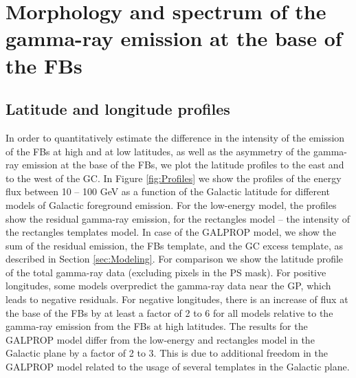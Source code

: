 \section{Morphology and spectrum of the gamma-ray emission at the base of the FBs}


\subsection{Latitude and longitude profiles}
\label{sec:Latitude_profiles}

In order to quantitatively estimate the difference in the intensity of the emission of the FBs at high and at low latitudes, as well as the asymmetry
of the gamma-ray emission at the base of the FBs,
we plot the latitude profiles to the east and to the west of the GC.
In Figure \ref{fig:Profiles} we show the profiles of the energy flux between 10 -- 100 GeV as a function 
of the Galactic latitude for different models of Galactic foreground emission.
For the low-energy model, the profiles show the residual gamma-ray emission, 
for the rectangles model -- the intensity of the rectangles templates model.
In case of the GALPROP model, we show the sum of the residual emission, the FBs template, 
and the GC excess template, as described in Section \ref{sec:Modeling}. 
For comparison we show the latitude profile of the total gamma-ray data (excluding pixels in the PS mask).
For positive longitudes,
some models overpredict the gamma-ray data near the GP, which leads to negative residuals.
For negative longitudes, there is an increase of flux at the base of the FBs 
by at least a factor of 2 to 6 for all models relative to the gamma-ray emission from the FBs at high latitudes. 
The results for the GALPROP model differ from the low-energy and rectangles model in the Galactic plane by a factor of 2 to 3. 
This is due to additional freedom in the GALPROP model related to the usage of several templates in the Galactic plane.


